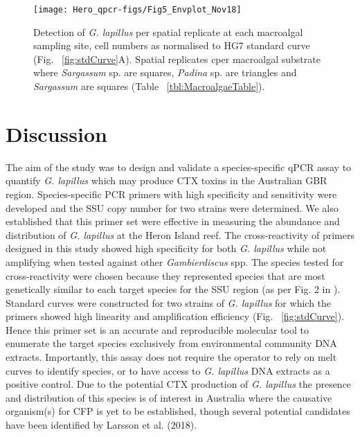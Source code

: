 \documentclass[12pt]{article}
\begin{document}
\begin{figure} 
\texttt{[image: Hero\_qpcr-figs/Fig5\_Envplot\_Nov18]}
\caption{Detection of \emph{G. lapillus} per spatial replicate at each macroalgal sampling site, cell numbers as normalised to HG7 standard curve (Fig. ~\ref{fig:stdCurve}A). Spatial replicates cper macroalgal substrate where \emph{Sargassum} sp. are squares, \emph{Padina} sp. are triangles and \textit{Sargassum} are squares (Table ~\ref{tbl:MacroalgaeTable}).} 
\label{fig:envHG7}
\end{figure} 
\FloatBarrier


\newpage
\section*{Discussion}
The aim of the study was to design and validate a species-specific qPCR assay to quantify \emph{G. lapillus} %
which may produce CTX toxins in the Australian GBR region. 
Species-specific PCR primers with high specificity and sensitivity were developed and the SSU copy number for two strains were determined. 
We also established that this primer set were effective in measuring the abundance and distribution of %
\textit{G. lapillus} at the Heron Island reef.
The cross-reactivity of primers designed in this study showed high specificity for both \emph{G. lapillus} %
while not amplifying when tested against other \emph{Gambierdiscus} spp. 
The species tested for cross-reactivity were chosen because they represented species that are most genetically similar to each target species for the SSU region (as per Fig. 2 in \citep{kretzschmar2017characterization}).
Standard curves were constructed for two strains of \emph{G. lapillus} %
for which the primers showed high linearity and amplification efficiency (Fig. ~\ref{fig:stdCurve}). 
Hence this primer set is an accurate and reproducible molecular tool to enumerate the target species exclusively from environmental community DNA extracts. 
Importantly, %
this assay does not require the operator to rely on melt curves to identify species, or to have access to \emph{G. lapillus} %
DNA extracts as a positive control. 
Due to the potential CTX production of \emph{G. lapillus} \citep{kretzschmar2017characterization,larsson2018toxicology} %
the presence and distribution of this species is of interest in Australia where the causative organism(s) for CFP is yet to be established, though several potential candidates have been identified by Larsson et al. (2018).\\
\end{document}
